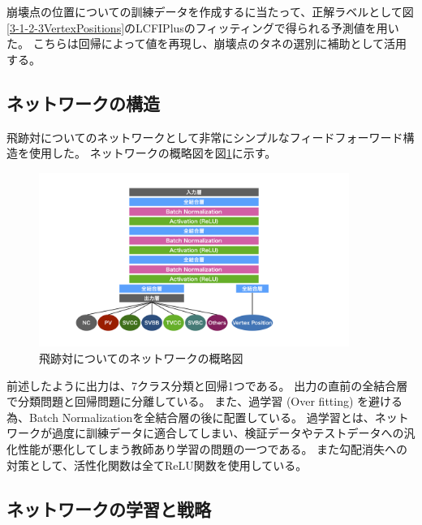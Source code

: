崩壊点の位置についての訓練データを作成するに当たって、正解ラベルとして図\ref{3-1-2-3VertexPositions}のLCFIPlusのフィッティングで得られる予測値を用いた。
こちらは回帰によって値を再現し、崩壊点のタネの選別に補助として活用する。


\subsection{ネットワークの構造} \label{Net:PM:StructureofPM}

飛跡対についてのネットワークとして非常にシンプルなフィードフォーワード構造を使用した。
ネットワークの概略図を図\ref{3-3-1-1PairModel}に示す。

\begin{figure}[htbp]
 \centering
 \includegraphics[trim = 200 50 200 50, width=0.9\textwidth, clip]{Figure/3Networks/3-3-1-1PairModel.png}
 \caption{飛跡対についてのネットワークの概略図}
 \label{3-3-1-1PairModel}
\end{figure}

前述したように出力は、7クラス分類と回帰1つである。
出力の直前の全結合層で分類問題と回帰問題に分離している。
また、過学習 (Over fitting) を避ける為、Batch Normalization\cite{BatchNormalizationpaper}を全結合層の後に配置している。
過学習とは、ネットワークが過度に訓練データに適合してしまい、検証データやテストデータへの汎化性能が悪化してしまう教師あり学習の問題の一つである。
また勾配消失への対策として、活性化関数は全てReLU関数を使用している。


\subsection{ネットワークの学習と戦略} \label{Net:PM:TrainingandStrategyofPM}


